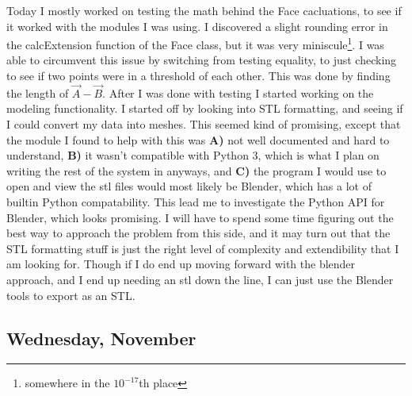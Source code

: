 \documentclass[letterpaper,oneside,titlepage]{article}
\begin{document}
Today I mostly worked on testing the math behind the Face cacluations, to see if it worked with the modules I was using.  I discovered a slight rounding error in the calcExtension function of the Face class, but it was very miniscule\footnote{somewhere in the $10^{-17}$th place}.  I was able to circumvent this issue by switching from testing equality, to just checking to see if two points were in a threshold of each other.  This was done by finding the length of $\vec{A} - \vec{B}$.  After I was done with testing I started working on the modeling functionality.  I started off by looking into STL formatting, and seeing if I could convert my data into meshes.  This seemed kind of promising, except that the module I found to help with this was \textbf{A)} not well documented and hard to understand, \textbf{B)} it wasn't compatible with Python 3, which is what I plan on writing the rest of the system in anyways, and \textbf{C)} the program I would use to open and view the stl files would most likely be Blender, which has a lot of builtin Python compatability.  This lead me to investigate the Python API for Blender, which looks promising.  I will have to spend some time figuring out the best way to approach the problem from this side, and it may turn out that the STL formatting stuff is just the right level of complexity and extendibility that I am looking for.  Though if I do end up moving forward with the blender approach, and I end up needing an stl down the line, I can just use the Blender tools to export as an STL.

\subsection*{Wednesday, November }
\end{document}
